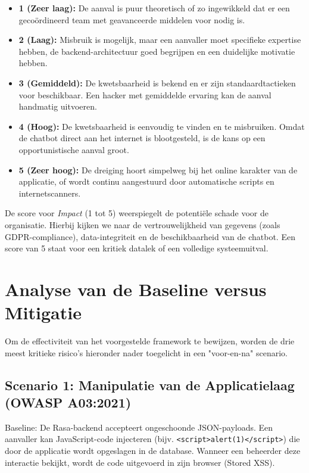 \begin{itemize}
    \item \textbf{1 (Zeer laag):} De aanval is puur theoretisch of zo ingewikkeld dat er een gecoördineerd team met geavanceerde middelen voor nodig is.
    \item \textbf{2 (Laag):} Misbruik is mogelijk, maar een aanvaller moet specifieke expertise hebben, de backend-architectuur goed begrijpen en een duidelijke motivatie hebben.
    \item \textbf{3 (Gemiddeld):} De kwetsbaarheid is bekend en er zijn standaardtactieken voor beschikbaar. Een hacker met gemiddelde ervaring kan de aanval handmatig uitvoeren.
    \item \textbf{4 (Hoog):} De kwetsbaarheid is eenvoudig te vinden en te misbruiken. Omdat de chatbot direct aan het internet is blootgesteld, is de kans op een opportunistische aanval groot.
    \item \textbf{5 (Zeer hoog):} De dreiging hoort simpelweg bij het online karakter van de applicatie, of wordt continu aangestuurd door automatische scripts en internetscanners.
\end{itemize}

De score voor \textit{Impact} (1 tot 5) weerspiegelt de potentiële schade voor de organisatie. Hierbij kijken we naar de vertrouwelijkheid van gegevens (zoals GDPR-compliance), data-integriteit en de beschikbaarheid van de chatbot. Een score van 5 staat voor een kritiek datalek of een volledige systeemuitval.

\section{Analyse van de Baseline versus Mitigatie}

Om de effectiviteit van het voorgestelde framework te bewijzen, worden de drie meest kritieke risico's hieronder nader toegelicht in een "voor-en-na" scenario.

\subsection{Scenario 1: Manipulatie van de Applicatielaag (OWASP A03:2021)}

Baseline: De Rasa-backend accepteert ongeschoonde JSON-payloads. Een aanvaller kan JavaScript-code injecteren (bijv. \texttt{<script>alert(1)</script>}) die door de applicatie wordt opgeslagen in de database. Wanneer een beheerder deze interactie bekijkt, wordt de code uitgevoerd in zijn browser (Stored XSS).\\

